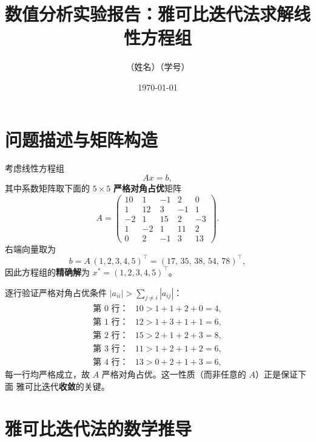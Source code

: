 \documentclass[12pt,a4paper]{ctexart}
\title{\bfseries 数值分析实验报告：雅可比迭代法求解线性方程组}
\author{（姓名）\quad （学号）}
\date{\today}
\begin{document}
\maketitle

\section{问题描述与矩阵构造}

考虑线性方程组
\begin{equation}
  Ax = b,
\end{equation}
其中系数矩阵取下面的 $5\times 5$ \textbf{严格对角占优}矩阵
\begin{equation}
  A =
  \begin{pmatrix}
    10 & 1 & -1 & 2 & 0 \\
    1 & 12 & 3 & -1 & 1 \\
    -2 & 1 & 15 & 2 & -3 \\
    1 & -2 & 1 & 11 & 2 \\
    0 & 2 & -1 & 3 & 13
  \end{pmatrix}.
\end{equation}
右端向量取为
\begin{equation}
  b = A\,(1,2,3,4,5)^{\top} = (17,\,35,\,38,\,54,\,78)^{\top},
\end{equation}
因此方程组的\textbf{精确解}为 $x^{\ast} = (1,2,3,4,5)^{\top}$。

逐行验证严格对角占优条件 $|a_{ii}| > \sum_{j\neq i}|a_{ij}|$：
\begin{equation*}
  \begin{aligned}
    \text{第 }0\text{ 行：}& 10 > 1+1+2+0 = 4,\\
    \text{第 }1\text{ 行：}& 12 > 1+3+1+1 = 6,\\
    \text{第 }2\text{ 行：}& 15 > 2+1+2+3 = 8,\\
    \text{第 }3\text{ 行：}& 11 > 1+2+1+2 = 6,\\
    \text{第 }4\text{ 行：}& 13 > 0+2+1+3 = 6,
  \end{aligned}
\end{equation*}
每一行均严格成立，故 $A$ 严格对角占优。这一性质（而非任意的 $A$）正是保证下面
雅可比迭代\textbf{收敛}的关键。

\section{雅可比迭代法的数学推导}
\end{document}
